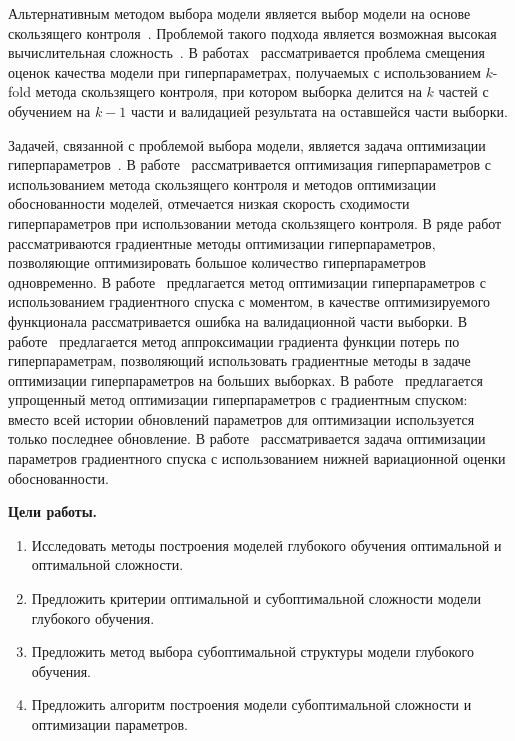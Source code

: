 Альтернативным методом выбора модели является выбор модели на основе скользящего контроля~\cite{cv_ms, tokmakova}. Проблемой такого подхода является возможная высокая вычислительная сложность~\cite{expensive, expensive2}. В работах~\cite{bias,bias2} рассматривается проблема смещения оценок качества модели при гиперпараметрах, получаемых с использованием $k$-fold метода скользящего контроля, при котором выборка делится на $k$ частей с обучением на $k-1$ части и валидацией результата на оставшейся части выборки. 

Задачей, связанной с проблемой выбора модели, является задача оптимизации гиперпараметров~\cite{mackay,bishop}. В работе~\cite{tokmakova} рассматривается оптимизация гиперпараметров с использованием метода скользящего контроля и методов оптимизации обоснованности моделей, отмечается низкая скорость сходимости гиперпараметров при использовании метода скользящего контроля. В ряде работ~\cite{hyper, hyper2} рассматриваются градиентные методы оптимизации гиперпараметров, позволяющие оптимизировать большое количество гиперпараметров одновременно. В работе~\cite{hyper} предлагается метод оптимизации гиперпараметров с использованием градиентного спуска с моментом, в качестве оптимизируемого функционала рассматривается ошибка на валидационной части выборки. В работе~\cite{approx_hyper} предлагается метод аппроксимации градиента функции потерь по гиперпараметрам, позволяющий использовать градиентные методы в задаче оптимизации гиперпараметров на больших выборках. В работе~\cite{greed_hyper} предлагается упрощенный метод оптимизации гиперпараметров с градиентным спуском: вместо всей истории обновлений параметров для оптимизации используется только последнее обновление. В работе~\cite{sgd_cont} рассматривается задача оптимизации параметров градиентного спуска с использованием нижней вариационной оценки обоснованности. 


\vspace{0.5cm}
\textbf{Цели работы.}
\vspace{0.2cm}
\begin{enumerate}
\item Исследовать методы построения моделей глубокого обучения оптимальной и оптимальной сложности.
\item Предложить критерии оптимальной и субоптимальной сложности модели глубокого обучения.
\item Предложить метод выбора субоптимальной структуры модели глубокого обучения.
\item Предложить алгоритм построения модели субоптимальной сложности и оптимизации параметров.
\end{enumerate}


